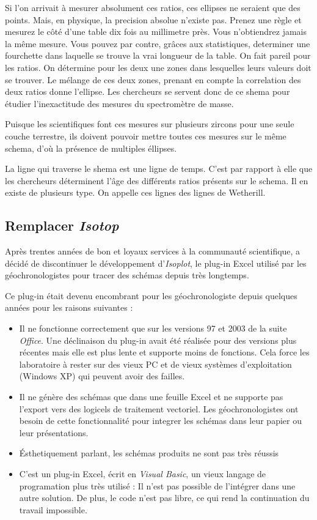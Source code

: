 Si l'on arrivait à mesurer absolument ces ratios, ces ellipses ne seraient que des points. Mais, en physique, la precision absolue n'existe pas. Prenez une règle et mesurez le côté d'une table dix fois au millimetre près. Vous n'obtiendrez jamais la même mesure. Vous pouvez par contre, grâces aux statistiques, determiner une fourchette dans laquelle se trouve la vrai longueur de la table. On fait pareil pour les ratios. On détermine pour les deux une zones dans lesquelles leurs valeurs doit se trouver. Le mélange de ces deux zones, prenant en compte la correlation des deux ratios donne l'ellipse. Les chercheurs se servent donc de ce shema pour étudier l'inexactitude des mesures du spectromètre de masse.

Puisque les scientifiques font ces mesures sur plusieurs zircons pour une seule couche terrestre, ils doivent pouvoir mettre toutes ces mesures sur le même schema, d'où la présence de multiples éllipses.

La ligne qui traverse le shema est une ligne de temps. C'est par rapport à elle que les chercheurs déterminent l'âge des différents ratios présents sur le schema. Il en existe de plusieurs type. On appelle ces lignes des lignes de Wetherill.

\subsection{Remplacer \textit{Isotop}}
Après trentes années de bon et loyaux services à la communauté scientifique, %
a décidé de discontinuer le développement d'\textit{Isoplot}, le plug-in Excel utilisé par les géochronologistes pour tracer des schémas depuis très longtemps.

Ce plug-in était devenu encombrant pour les géochronologiste depuis quelques années pour les raisons suivantes :
\begin{itemize}
\item Il ne fonctionne correctement que sur les versions 97 et 2003 de la suite \textit{Office}. Une déclinaison du plug-in avait été réalisée pour des versions plus récentes mais elle est plus lente et supporte moins de fonctions. Cela force les laboratoire à rester sur des vieux PC et de vieux systèmes d'exploitation (Windows XP) qui peuvent avoir des failles.
\item Il ne génère des schémas que dans une feuille Excel et ne supporte pas l'export vers des logicels de traitement vectoriel. Les géochronologistes ont besoin de cette fonctionnalité pour integrer les schémas dans leur papier ou leur présentations.
\item Ésthetiquement parlant, les schémas produits ne sont pas très réussis
\item C'est un plug-in Excel, écrit en \textit{Visual Basic}, un vieux langage de programation plus très utilisé : Il n'est pas possible de l'intégrer dans une autre solution. De plus, le code n'est pas libre, ce qui rend la continuation du travail impossible.
\end{itemize}

